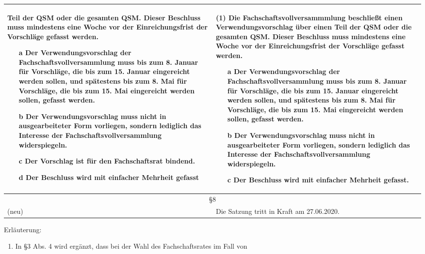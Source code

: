 {\begin{longtable}{|p{7.5cm}|p{7.5cm}|}
        Teil der QSM oder die gesamten QSM. Dieser Beschluss muss mindestens eine Woche vor
        der Einreichungsfrist der Vorschläge gefasst werden.
        \begin{enumerate}
            \item[a] Der Verwendungsvorschlag der Fachschaftsvollversammlung muss bis zum 8. Januar
            für Vorschläge, die bis zum 15. Januar eingereicht werden sollen, und spätestens bis
            zum 8. Mai für Vorschläge, die bis zum 15. Mai eingereicht werden sollen, gefasst
            werden.
            \item[b] Der Verwendungsvorschlag muss nicht in ausgearbeiteter Form vorliegen, sondern
            lediglich das Interesse der Fachschaftsvollversammlung widerspiegeln.
            \item[c] Der Vorschlag ist für den Fachschaftsrat bindend.
            \item[d] Der Beschluss wird mit einfacher Mehrheit gefasst
        \end{enumerate}
    &   (1) Die Fachschaftsvollversammmlung beschließt einen Verwendungsvorschlag über einen
        Teil der QSM oder die gesamten QSM. Dieser Beschluss muss mindestens eine Woche vor
        der Einreichungsfrist der Vorschläge gefasst werden.
        \begin{enumerate}
            \item[a] Der Verwendungsvorschlag der Fachschaftsvollversammlung muss bis zum 8. Januar
            für Vorschläge, die bis zum 15. Januar eingereicht werden sollen, und spätestens bis
            zum 8. Mai für Vorschläge, die bis zum 15. Mai eingereicht werden sollen, gefasst
            werden.
            \item[b] Der Verwendungsvorschlag muss nicht in ausgearbeiteter Form vorliegen, sondern
            lediglich das Interesse der Fachschaftsvollversammlung widerspiegeln.
            \item[c] Der Beschluss wird mit einfacher Mehrheit gefasst.
        \end{enumerate}\\\hline
        \multicolumn{2}{|c|}{§8}\\\hline
        (neu) & Die Satzung tritt in Kraft am 27.06.2020.\\\hline
        \end{longtable}
        Erläuterung:\\
        \begin{enumerate}
            \item In §3 Abs. 4 wird ergänzt, dass bei der Wahl des Fachschaftsrates im Fall von

\end{enumerate}}
